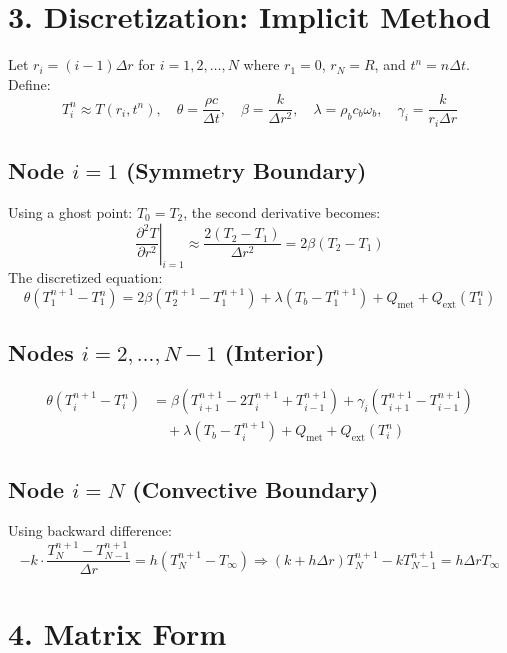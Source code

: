 \documentclass[12pt]{article}
\begin{document}
\section*{3. Discretization: Implicit Method}

Let \( r_i = (i - 1)\Delta r \) for \( i = 1, 2, \dots, N \) where \( r_1 = 0 \), \( r_N = R \), and \( t^n = n\Delta t \). Define:
\[
T_i^n \approx T(r_i, t^n), \quad 
\theta = \frac{\rho c}{\Delta t}, \quad 
\beta = \frac{k}{\Delta r^2}, \quad 
\lambda = \rho_b c_b \omega_b, \quad 
\gamma_i = \frac{k}{r_i \Delta r}
\]

\subsection*{Node \( i = 1 \) (Symmetry Boundary)}

Using a ghost point: \( T_0 = T_2 \), the second derivative becomes:
\[
\left. \frac{\partial^2 T}{\partial r^2} \right|_{i=1} \approx \frac{2(T_2 - T_1)}{\Delta r^2} = 2\beta (T_2 - T_1)
\]
The discretized equation:
\[
\theta (T_1^{n+1} - T_1^n) = 2\beta (T_2^{n+1} - T_1^{n+1}) + \lambda (T_b - T_1^{n+1}) + Q_{\text{met}} + Q_{\text{ext}}(T_1^n)
\]

\subsection*{Nodes \( i = 2, \dots, N-1 \) (Interior)}

\begin{align*}
\theta (T_i^{n+1} - T_i^n) &= 
\beta (T_{i+1}^{n+1} - 2T_i^{n+1} + T_{i-1}^{n+1}) 
+ \gamma_i (T_{i+1}^{n+1} - T_{i-1}^{n+1}) \\
&\quad + \lambda (T_b - T_i^{n+1}) + Q_{\text{met}} + Q_{\text{ext}}(T_i^n)
\end{align*}

\subsection*{Node \( i = N \) (Convective Boundary)}

Using backward difference:
\[
-k \cdot \frac{T_N^{n+1} - T_{N-1}^{n+1}}{\Delta r} = h (T_N^{n+1} - T_\infty)
\Rightarrow (k + h \Delta r) T_N^{n+1} - k T_{N-1}^{n+1} = h \Delta r T_\infty
\]

\section*{4. Matrix Form}
\end{document}
